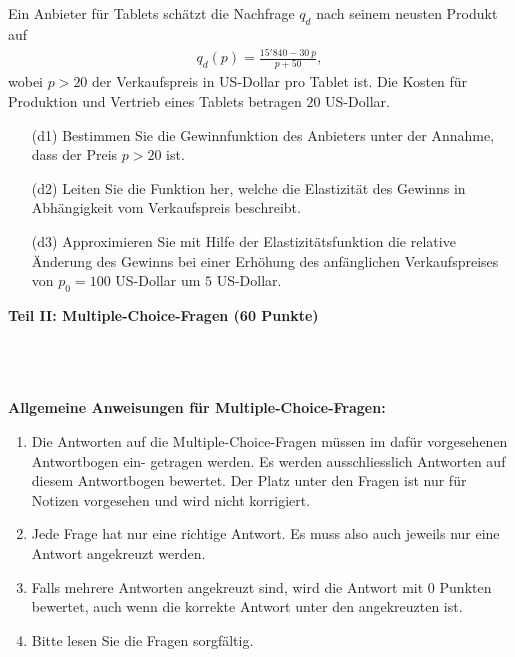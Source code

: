 \subsection*{}
Ein Anbieter für Tablets schätzt die Nachfrage $ q_d $ nach seinem neusten Produkt auf
\begin{align*}
	q_d(p)
	=
	\frac{15'840 - 30 \ p}{p + 50},
\end{align*}
wobei $ p > 20  $ der Verkaufspreis in US-Dollar pro Tablet ist.
Die Kosten für Produktion und Vertrieb eines Tablets betragen $ 20  $ US-Dollar.
\begin{enumerate}
	\item[(d1)]
	Bestimmen Sie die Gewinnfunktion des Anbieters unter der Annahme, dass der Preis $ p > 20 $ ist.
	\item[(d2)]
	Leiten Sie die Funktion her, welche die Elastizität des Gewinns in Abhängigkeit vom Verkaufspreis beschreibt.
	\item[(d3)]
	Approximieren Sie mit Hilfe der Elastizitätsfunktion die relative Änderung des Gewinns bei einer Erhöhung des anfänglichen Verkaufspreises von $ p_0 = 100 $ US-Dollar um $ 5 $ US-Dollar.
\end{enumerate}

\newpage


\begin{Large}
\textbf{Teil II: Multiple-Choice-Fragen (60 Punkte)}
\end{Large}
\\
\\
\\
\textbf{Allgemeine Anweisungen für Multiple-Choice-Fragen:}
\\
\renewcommand{\labelenumi}{(\roman{enumi})}
\begin{enumerate}
\item
Die Antworten auf die Multiple-Choice-Fragen müssen im dafür vorgesehenen Antwortbogen ein-
getragen werden. Es werden ausschliesslich Antworten auf diesem Antwortbogen bewertet. Der
Platz unter den Fragen ist nur für Notizen vorgesehen und wird nicht korrigiert.

\item
Jede Frage hat nur eine richtige Antwort. Es muss also auch jeweils nur eine Antwort angekreuzt
werden.

\item
Falls mehrere Antworten angekreuzt sind, wird die Antwort mit 0 Punkten bewertet, auch wenn
die korrekte Antwort unter den angekreuzten ist.

\item
Bitte lesen Sie die Fragen sorgfältig.

\end{enumerate}
\newpage
